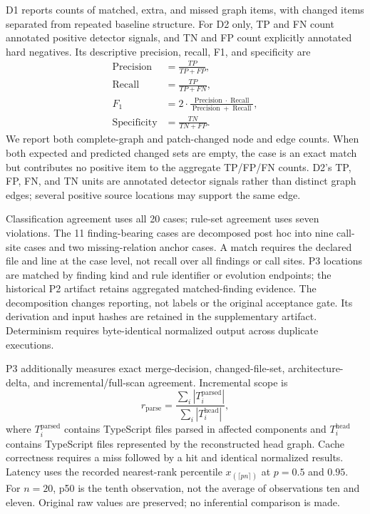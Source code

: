 \documentclass[conference]{IEEEtran}
\begin{document}
D1 reports counts of matched, extra, and missed graph items, with changed items separated from repeated baseline structure. For D2 only, TP and FN count annotated positive detector signals, and TN and FP count explicitly annotated hard negatives. Its descriptive precision, recall, F1, and specificity are
\begin{align}
  \operatorname{Precision} &= \frac{TP}{TP+FP},\\
  \operatorname{Recall} &= \frac{TP}{TP+FN},\\
  F_1 &= 2\cdot\frac{\operatorname{Precision}\cdot\operatorname{Recall}}
  {\operatorname{Precision}+\operatorname{Recall}},\\
  \operatorname{Specificity} &= \frac{TN}{TN+FP}.
\end{align}
We report both complete-graph and patch-changed node and edge counts. When both expected and predicted changed sets are empty, the case is an exact match but contributes no positive item to the aggregate TP/FP/FN counts. D2's TP, FP, FN, and TN units are annotated detector signals rather than distinct graph edges; several positive source locations may support the same edge.

Classification agreement uses all 20 cases; rule-set agreement uses seven violations. The 11 finding-bearing cases are decomposed post hoc into nine call-site cases and two missing-relation anchor cases. A match requires the declared file and line at the case level, not recall over all findings or call sites. P3 locations are matched by finding kind and rule identifier or evolution endpoints; the historical P2 artifact retains aggregated matched-finding evidence. The decomposition changes reporting, not labels or the original acceptance gate. Its derivation and input hashes are retained in the supplementary artifact. Determinism requires byte-identical normalized output across duplicate executions.

P3 additionally measures exact merge-decision, changed-file-set, architecture-delta, and incremental/full-scan agreement. Incremental scope is
\begin{equation}
  r_{\mathrm{parse}}=\frac{\sum_i |T_i^{\mathrm{parsed}}|}{\sum_i |T_i^{\mathrm{head}}|},
\end{equation}
where $T_i^{\mathrm{parsed}}$ contains TypeScript files parsed in affected components and $T_i^{\mathrm{head}}$ contains TypeScript files represented by the reconstructed head graph. Cache correctness requires a miss followed by a hit and identical normalized results. Latency uses the recorded nearest-rank percentile $x_{(\lceil pn\rceil)}$ at $p=0.5$ and $0.95$. For $n=20$, p50 is the tenth observation, not the average of observations ten and eleven. Original raw values are preserved; no inferential comparison is made.
\end{document}
